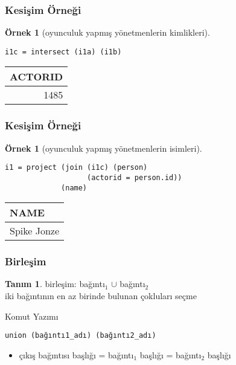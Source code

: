 \documentclass[dvipsnames]{beamer}
\theoremstyle{definition}
\newtheorem{tanim}[theorem]{Tanım}
\theoremstyle{example}
\newtheorem{ornek}[theorem]{Örnek}
\theoremstyle{plain}
\begin{document}
\begin{frame}[fragile]
  \frametitle{Kesişim Örneği}

  \begin{ornek}[oyunculuk yapmış yönetmenlerin kimlikleri]
    \begin{lstlisting}
i1c = intersect (i1a) (i1b)
    \end{lstlisting}

    \pause
    \begin{tiny}
    \begin{table}
      \begin{tabular}{|r|}\hline
ACTORID\\\hline\hline
   1485\\\hline
      \end{tabular}
    \end{table}
    \end{tiny}
  \end{ornek}
\end{frame}

\begin{frame}[fragile]
  \frametitle{Kesişim Örneği}

  \begin{ornek}[oyunculuk yapmış yönetmenlerin isimleri]
    \begin{lstlisting}
i1 = project (join (i1c) (person)
                   (actorid = person.id))
             (name)
    \end{lstlisting}

    \pause
    \begin{tiny}
    \begin{table}
      \begin{tabular}{|l|}\hline
NAME       \\\hline\hline
Spike Jonze\\\hline
      \end{tabular}
    \end{table}
    \end{tiny}
  \end{ornek}
\end{frame}

\begin{frame}[fragile]
  \frametitle{Birleşim}

  \begin{tanim}
    \alert{birleşim}: bağıntı$_1$ $\cup$ bağıntı$_2$\\
      iki bağıntının en az birinde bulunan çokluları seçme
  \end{tanim}

  \pause
  \begin{block}{Komut Yazımı}
    \begin{lstlisting}
union (bağıntı1_adı) (bağıntı2_adı)
    \end{lstlisting}
  \end{block}

  \pause
  \begin{itemize}
    \item çıkış bağıntısı başlığı = bağıntı$_1$ başlığı = bağıntı$_2$ başlığı
  \end{itemize}
\end{frame}
\end{document}
